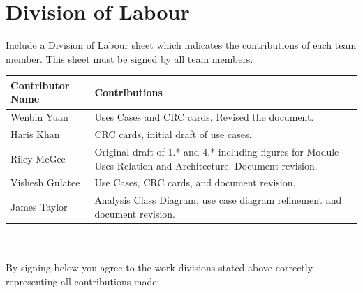 \documentclass[]{article}
\begin{document}
\appendix
\section{Division of Labour}
\label{sec:division_of_labour}
Include a Division of Labour sheet which indicates the contributions of each team member. This sheet must be signed by all team members.

\begin{tabular}{ | l | l | }
\hline
	\textbf{Contributor Name} & \textbf{Contributions}  \\
  	\hline
  	Wenbin Yuan & Uses Cases and CRC cards. Revised the document. \\
  	\hline
  	Haris Khan &  CRC cards, initial draft of use cases. \\
  	\hline
		Riley McGee & Original draft of 1.* and 4.* including figures for Module Uses Relation and Architecture. Document revision.\\
  	\hline
		Vishesh Gulatee & Use Cases, CRC cards, and document revision. \\
  	\hline
		James Taylor & Analysis Class Diagram, use case diagram refinement and document revision. \\
  	\hline
\end{tabular}
\\
\\
By signing below you agree to the work divisions stated above correctly representing all contributions made:



\newpage
\end{document}

